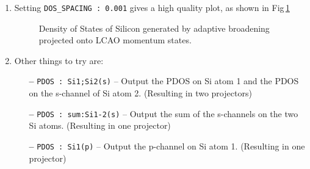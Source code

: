 \documentclass[a4paper,11pt,twoside]{book}
\begin{document}
{\begin{enumerate}
\verb#xmgrace -nxy Si2.pdos.dat#

\item Setting {\tt DOS\_SPACING : 0.001} gives a high quality plot, as shown in Fig\,\ref{fig:Si2_PDOS}

\begin{figure}[h]
\begin{center}
\caption{Density of States of Silicon generated by adaptive broadening projected onto LCAO momentum states.}
\label{fig:Si2_PDOS} 
\end{center}
\end{figure}


\item Other things to try are:
\begin{itemize}
\item[{\bf --}]  \verb#PDOS : Si1;Si2(s)#  -- Output the PDOS on Si atom 1 and the PDOS on the s-channel of Si atom 2. (Resulting in two projectors)
\item[{\bf --}]  \verb#PDOS : sum:Si1-2(s)#  --  Output the sum of the s-channels on the two Si atoms. (Resulting in one projector)
\item[{\bf --}]  \verb#PDOS : Si1(p)# -- Output the p-channel on Si atom 1. (Resulting in one projector)
\end{itemize}
\end{enumerate}


}
\end{document}
